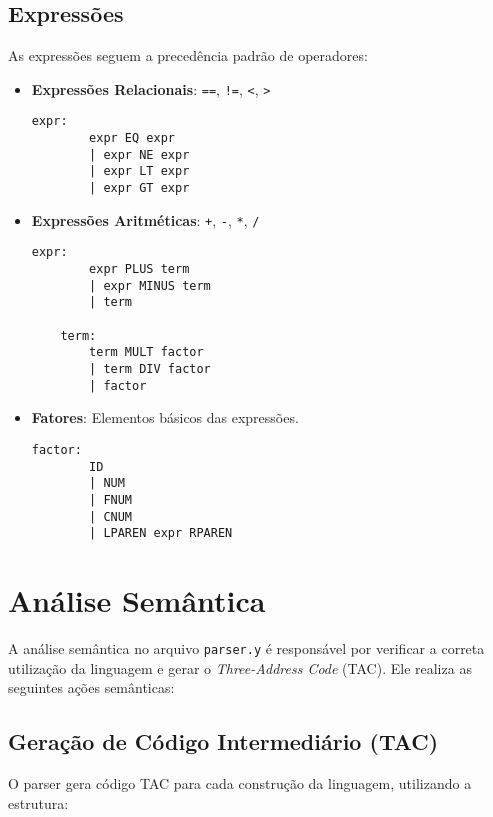 \documentclass[10pt,twocolumn]{article}
\begin{document}
    \subsection{Expressões}

        As expressões seguem a precedência padrão de operadores:

        \begin{itemize}
            \item \textbf{Expressões Relacionais}: \texttt{==}, \texttt{!=}, \texttt{<}, \texttt{>}
            \begin{lstlisting}[caption=Expressões comparativas,captionpos=b]
    expr:
        expr EQ expr
        | expr NE expr
        | expr LT expr
        | expr GT expr
            \end{lstlisting}

            \item \textbf{Expressões Aritméticas}: \texttt{+}, \texttt{-}, \texttt{*}, \texttt{/}
            \begin{lstlisting}[caption=Expressões aritméticas,captionpos=b]
    expr:
        expr PLUS term
        | expr MINUS term
        | term

    term:
        term MULT factor
        | term DIV factor
        | factor
            \end{lstlisting}

            \item \textbf{Fatores}: Elementos básicos das expressões.
            \begin{lstlisting}[caption=Estrutura de expressões,captionpos=b]
    factor:
        ID
        | NUM
        | FNUM
        | CNUM
        | LPAREN expr RPAREN
            \end{lstlisting}
        \end{itemize}

\section{Análise Semântica}
    A análise semântica no arquivo \texttt{parser.y} é responsável por verificar a 
    correta utilização da linguagem e gerar o \textit{Three-Address Code} (TAC). 
    Ele realiza as seguintes ações semânticas:

    \subsection{Geração de Código Intermediário (TAC)}
        O parser gera código TAC para cada construção da linguagem, utilizando a estrutura:
        
\end{document}
